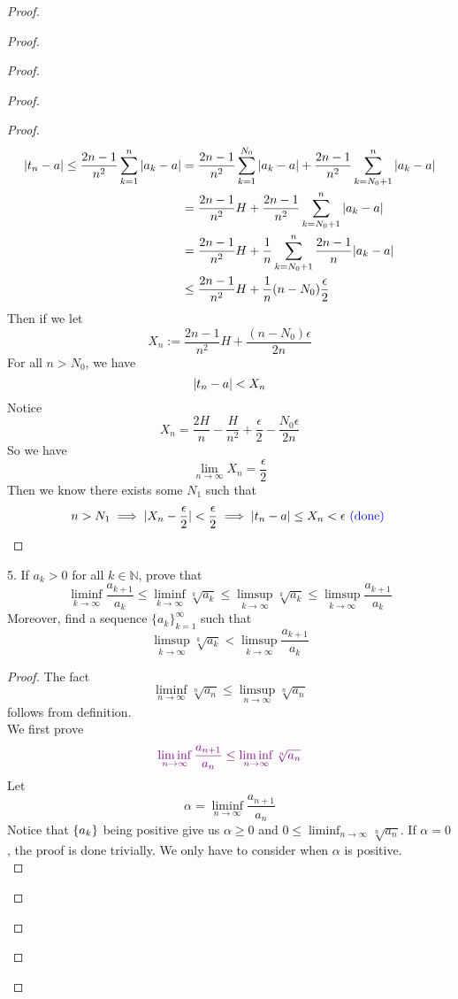 \documentclass{report}
\begin{document}
\begin{proof}
\begin{proof}
\begin{proof}
\begin{proof}
\begin{proof}
\begin{align}
  |t_n-a|\leq \frac{2n-1}{n^2}\sum_{k=1}^n |a_k-a|&=\frac{2n-1}{n^2}\sum_{k=1}^{N_0}|a_k-a|+\frac{2n-1}{n^2}\sum_{k=N_0+1}^n |a_k-a|\\
&=\frac{2n-1}{n^2}H+\frac{2n-1}{n^2}\sum_{k=N_0+1}^n |a_k-a|\\
&= \frac{2n-1}{n^2}H+\frac{1}{n}\sum_{k=N_0+1}^n \frac{2n-1}{n}|a_k-a|\\
&\leq  \frac{2n-1}{n^2}H+ \frac{1}{n}(n-N_0) \frac{\epsilon }{2} 
\end{align}
Then if we let 
\begin{equation}
X_n:=\frac{2n-1}{n^2}H+\frac{(n-N_0)\epsilon }{2n}
\end{equation}
For all $n>N_0$, we have
 \begin{equation}
|t_n-a|<X_n
\end{equation}
Notice 
\begin{equation}
X_n=\frac{2H}{n}-\frac{H}{n^2}+\frac{\epsilon}{2}-\frac{N_0\epsilon }{2n}
\end{equation}
So we have
\begin{equation}
\lim_{n\to\infty}X_n=\frac{\epsilon}{2}
\end{equation}
Then we know there exists some $N_1$ such that 
 \begin{equation}
   n>N_1\implies |X_n-\frac{\epsilon}{2}|<\frac{\epsilon}{2}\implies |t_n-a|\leq X_n<\epsilon \textcolor{blue}{\text{ (done) }}
\end{equation}


\end{proof}
\begin{question}{}{}
5. If $a_k > 0$ for all $k \in \mathbb{N}$, prove that
\[
  \liminf_{k\to\infty} \frac{a_{k+1}}{a_k} \leq \liminf_{k\to\infty} \sqrt[k]{a_k} \leq \limsup_{k\to\infty} \sqrt[k]{a_k} \leq \limsup_{k\to\infty} \frac{a_{k+1}}{a_k}
\]
Moreover, find a sequence $\{a_k\}_{k=1}^{\infty}$ such that 
\[
  \limsup_{k\to\infty} \sqrt[k]{a_k} < \limsup_{k\to\infty} \frac{a_{k+1}}{a_k}
\]
\end{question}

\begin{proof}
The fact 
\begin{equation}
\liminf_{n\to\infty} \sqrt[n]{a_n}\leq \limsup_{n\to\infty} \sqrt[n]{a_n}  
\end{equation}
follows from definition.\\

We first prove
\begin{equation}
  \textcolor{violet}{\liminf_{n\to\infty} \frac{a_{n+1}}{a_n}\leq \liminf_{n\to\infty} \sqrt[n]{a_n}}
\end{equation}
Let 
\begin{equation}
\alpha =\liminf_{n\to\infty} \frac{a_{n+1}}{a_n}
\end{equation}
Notice that $\{ a_k \}$ being positive give us $\alpha \geq 0$ and $0\leq \liminf_{n\to\infty} \sqrt[n]{a_n} $. If $\alpha =0$, the proof is done trivially. We only have to consider when $\alpha $ is positive.\\


\end{proof}
\end{proof}
\end{proof}
\end{proof}
\end{proof}
\end{document}
